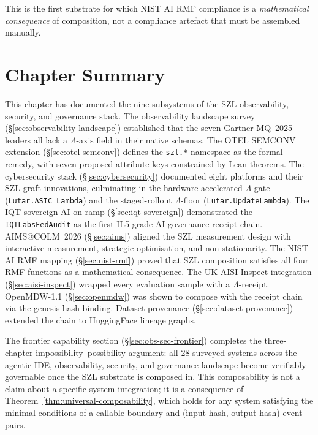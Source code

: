 This is the first substrate for which NIST AI RMF compliance is a
\emph{mathematical consequence} of composition, not a compliance artefact
that must be assembled manually.

\section{Chapter Summary}
\label{sec:obs-sec-summary}

This chapter has documented the nine subsystems of the SZL observability,
security, and governance stack.  The observability landscape survey
(\S\ref{sec:observability-landscape}) established that the seven Gartner MQ~2025
leaders all lack a $\Lambda$-axis field in their native schemas.  The OTEL
SEMCONV extension (\S\ref{sec:otel-semconv}) defines the \texttt{szl.*}
namespace as the formal remedy, with seven proposed attribute keys constrained
by Lean theorems.  The cybersecurity stack (\S\ref{sec:cybersecurity})
documented eight platforms and their SZL graft innovations, culminating in
the hardware-accelerated $\Lambda$-gate (\texttt{Lutar.ASIC\_Lambda}) and
the staged-rollout $\Lambda$-floor (\texttt{Lutar.UpdateLambda}).  The IQT
sovereign-AI on-ramp (\S\ref{sec:iqt-sovereign}) demonstrated the
\texttt{IQTLabsFedAudit} as the first IL5-grade AI governance receipt chain.
AIMS@COLM~2026 (\S\ref{sec:aims}) aligned the SZL measurement design with
interactive measurement, strategic optimisation, and non-stationarity.  The
NIST AI RMF mapping (\S\ref{sec:nist-rmf}) proved that SZL composition
satisfies all four RMF functions as a mathematical consequence.  The UK AISI
Inspect integration (\S\ref{sec:aisi-inspect}) wrapped every evaluation sample
with a $\Lambda$-receipt.  OpenMDW-1.1 (\S\ref{sec:openmdw}) was shown to
compose with the receipt chain via the genesis-hash binding.  Dataset
provenance (\S\ref{sec:dataset-provenance}) extended the chain to HuggingFace
lineage graphs.

The frontier capability section (\S\ref{sec:obs-sec-frontier}) completes
the three-chapter impossibility--possibility argument: all 28 surveyed systems
across the agentic IDE, observability, security, and governance landscape
become verifiably governable once the SZL substrate is composed in.  This
composability is not a claim about a specific system integration; it is
a consequence of Theorem~\ref{thm:universal-composability}, which holds
for any system satisfying the minimal conditions of a callable boundary
and (input-hash, output-hash) event pairs.

